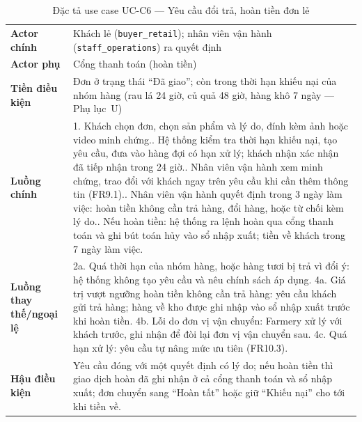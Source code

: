 \begingroup
\tblsetup
\begin{longtable}{L{3.00cm} L{12.25cm}}
\caption{Đặc tả use case UC-C6 --- Yêu cầu đổi trả, hoàn tiền đơn lẻ}
\label{tab:uc-c6} \\
\toprule
{}
 \\
\midrule
\endfirsthead
\bottomrule
\endfoot
\textbf{Actor chính} & Khách lẻ (\texttt{buyer\_retail}); nhân viên vận hành (\texttt{staff\_operations}) ra quyết định \\
\textbf{Actor phụ} & Cổng thanh toán (hoàn tiền) \\
\textbf{Tiền điều kiện} & Đơn ở trạng thái ``Đã giao''; còn trong thời hạn khiếu nại của nhóm hàng (rau lá 24 giờ, củ quả 48 giờ, hàng khô 7 ngày --- Phụ lục~U) \\
\textbf{Luồng chính} &
1. Khách chọn đơn, chọn sản phẩm và lý do, đính kèm ảnh hoặc video minh chứng.. Hệ thống kiểm tra thời hạn khiếu nại, tạo yêu cầu, đưa vào hàng đợi có hạn xử lý; khách nhận xác nhận đã tiếp nhận trong 24 giờ.. Nhân viên vận hành xem minh chứng, trao đổi với khách ngay trên yêu cầu khi cần thêm thông tin (FR9.1).. Nhân viên vận hành quyết định trong 3 ngày làm việc: hoàn tiền không cần trả hàng, đổi hàng, hoặc từ chối kèm lý do.. Nếu hoàn tiền: hệ thống ra lệnh hoàn qua cổng thanh toán và ghi bút toán hủy vào sổ nhập xuất; tiền về khách trong 7 ngày làm việc. \\
\textbf{Luồng thay thế/ngoại lệ} &
2a. Quá thời hạn của nhóm hàng, hoặc hàng tươi bị trả vì đổi ý: hệ thống không tạo yêu cầu và nêu chính sách áp dụng.\newline
4a. Giá trị vượt ngưỡng hoàn tiền không cần trả hàng: yêu cầu khách gửi trả hàng; hàng về kho được ghi nhập vào sổ nhập xuất trước khi hoàn tiền.\newline
4b. Lỗi do đơn vị vận chuyển: Farmery xử lý với khách trước, ghi nhận để đòi lại đơn vị vận chuyển sau.\newline
4c. Quá hạn xử lý: yêu cầu tự nâng mức ưu tiên (FR10.3). \\
\textbf{Hậu điều kiện} & Yêu cầu đóng với một quyết định có lý do; nếu hoàn tiền thì giao dịch hoàn đã ghi nhận ở cả cổng thanh toán và sổ nhập xuất; đơn chuyển sang ``Hoàn tất'' hoặc giữ ``Khiếu nại'' cho tới khi tiền về. \\
\end{longtable}
\endgroup



